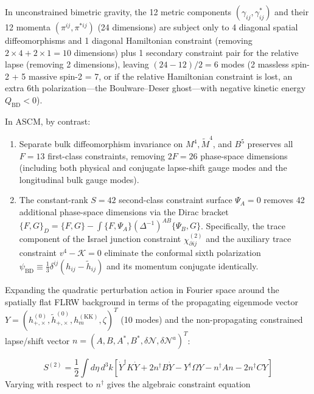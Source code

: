 \documentclass[aps,prd,onecolumn,superscriptaddress,nofootinbib,longbibliography,10pt]{revtex4-2}
\begin{document}
{{  In unconstrained bimetric gravity, the 12 metric components \((\gamma_{ij}, \gamma^*_{ij})\) and their 12 momenta \((\pi^{ij}, \pi^{*ij})\) (24 dimensions) are subject only to 4 diagonal spatial diffeomorphisms and 1 diagonal Hamiltonian constraint (removing \(2 \times 4 + 2 \times 1 = 10\) dimensions) plus 1 secondary constraint pair for the relative lapse (removing 2 dimensions), leaving \((24 - 12)/2 = 6\) modes (2 massless spin-2 + 5 massive spin-2 = 7, or if the relative Hamiltonian constraint is lost, an extra 6th polarization—the Boulware–Deser ghost—with negative kinetic energy \(Q_{\text{BD}} < 0\)).


  In ASCM, by contrast:


  
\begin{enumerate}
    
\item Separate bulk diffeomorphism invariance on \(M^4, \tilde{M}^4\), and \(B^5\) preserves all \(F = 13\) first-class constraints, removing \(2F = 26\) phase-space dimensions (including both physical and conjugate lapse-shift gauge modes and the longitudinal bulk gauge modes).
    
\item The constant-rank \(S = 42\) second-class constraint surface \(\Psi_A = 0\) removes 42 additional phase-space dimensions via the Dirac bracket \(\{F,G\}_D = \{F,G\} - \int \{F,\Psi_A\}(\Delta^{-1})^{AB}\{\Psi_B,G\}\). Specifically, the trace component of the Israel junction constraint \(\chi_{\partial ij}^{(2)}\) and the auxiliary trace constraint \(v^4 - \mathcal{K} = 0\) eliminate the conformal sixth polarization \(\psi_{\text{BD}} \equiv \frac{1}{3}\delta^{ij}(h_{ij} - \tilde{h}_{ij})\) and its momentum conjugate identically.
  
\end{enumerate}

  Expanding the quadratic perturbation action in Fourier space around the spatially flat FLRW background in terms of the propagating eigenmode vector \(Y = (h_{+, \times}^{(0)}, \tilde{h}_{+, \times}^{(0)}, h_m^{(\text{KK})}, \zeta)^T\) (10 modes) and the non-propagating constrained lapse/shift vector \(n = (A, B, A^*, B^*, \delta\mathcal{N}, \delta\mathcal{N}^a)^T\):


  \[ S^{(2)} = \frac{1}{2}\int d\eta\,d^3k \left[ \dot{Y}^\dagger K\dot{Y} + 2n^\dagger B\dot{Y} - Y^\dagger\Omega Y - n^\dagger A n - 2n^\dagger C Y \right] \]
  Varying with respect to \(n^\dagger\) gives the algebraic constraint equation


}}
\end{document}
